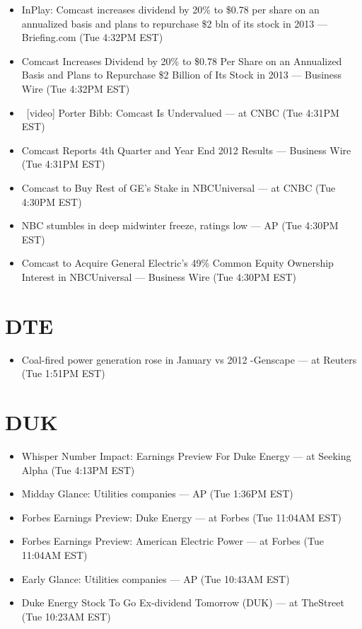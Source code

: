 \documentclass[11pt,asymmetric]{article}
\begin{document}
\begin{itemize}
\item InPlay: Comcast increases dividend by 20\% to \$0.78 per share on an annualized basis and plans to repurchase \$2 bln of its stock in 2013 --- Briefing.com (Tue 4:32PM EST)
\item Comcast Increases Dividend by 20\% to \$0.78 Per Share on an Annualized Basis and Plans to Repurchase \$2 Billion of Its Stock in 2013 --- Business Wire (Tue 4:32PM EST)
\item\ [video] Porter Bibb: Comcast Is Undervalued --- at CNBC (Tue 4:31PM EST)
\item Comcast Reports 4th Quarter and Year End 2012 Results --- Business Wire (Tue 4:31PM EST)
\item Comcast to Buy Rest of GE's Stake in NBCUniversal --- at CNBC (Tue 4:30PM EST)
\item NBC stumbles in deep midwinter freeze, ratings low --- AP (Tue 4:30PM EST)
\item Comcast to Acquire General Electric’s 49\% Common Equity Ownership Interest in NBCUniversal --- Business Wire (Tue 4:30PM EST)
\end{itemize}

\section*{DTE}
\begin{itemize}
\item Coal-fired power generation rose in January vs 2012 -Genscape --- at Reuters (Tue 1:51PM EST)
\end{itemize}

\section*{DUK}
\begin{itemize}
\item Whisper Number Impact: Earnings Preview For Duke Energy --- at Seeking Alpha (Tue 4:13PM EST)
\item Midday Glance: Utilities companies --- AP (Tue 1:36PM EST)
\item Forbes Earnings Preview: Duke Energy --- at Forbes (Tue 11:04AM EST)
\item Forbes Earnings Preview: American Electric Power --- at Forbes (Tue 11:04AM EST)
\item Early Glance: Utilities companies --- AP (Tue 10:43AM EST)
\item Duke Energy Stock To Go Ex-dividend Tomorrow (DUK) --- at TheStreet (Tue 10:23AM EST)
\end{itemize}
\end{document}
